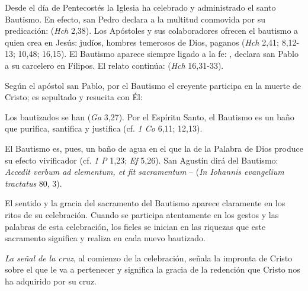 \begin{ccebody}
 Desde el día de Pentecostés la Iglesia ha celebrado y administrado el santo Bautismo. En efecto, san Pedro declara a la multitud conmovida por su predicación:  (\textit{Hch} 2,38). Los Apóstoles y sus colaboradores ofrecen el bautismo a quien crea en Jesús: judíos, hombres temerosos de Dios, paganos (\textit{Hch} 2,41; 8,12-13; 10,48; 16,15). El Bautismo aparece siempre ligado a la fe: , declara san Pablo a su carcelero en Filipos. El relato continúa:  (\textit{Hch} 16,31-33).

\newpage 

 Según el apóstol san Pablo, por el Bautismo el creyente participa en la muerte de Cristo; es sepultado y resucita con Él:


Los bautizados se han  (\textit{Ga} 3,27). Por el Espíritu Santo, el Bautismo es un baño que purifica, santifica y justifica (cf. \textit{1 Co} 6,11; 12,13).

 El Bautismo es, pues, un baño de agua en el que la  de la Palabra de Dios produce su efecto vivificador (cf. \textit{1 P} 1,23; \textit{Ef} 5,26). San Agustín dirá del Bautismo: \textit{Accedit verbum ad elementum, et fit sacramentum} –  (\textit{In Iohannis evangelium tractatus} 80, 3).


 El sentido y la gracia del sacramento del Bautismo aparece claramente en los ritos de su celebración. Cuando se participa atentamente en los gestos y las palabras de esta celebración, los fieles se inician en las riquezas que este sacramento significa y realiza en cada nuevo bautizado.

 \textit{La señal de la cruz}, al comienzo de la celebración, señala la impronta de Cristo sobre el que le va a pertenecer y significa la gracia de la redención que Cristo nos ha adquirido por su cruz.


\end{ccebody}
